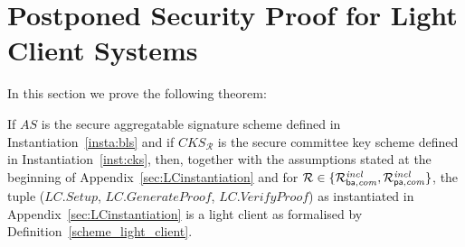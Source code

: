 \section{Postponed Security Proof for Light Client Systems}
\label{supplementary_proof_sec_soundness}

\noindent In this section we prove the following theorem:

\begingroup
\renewcommand{\thetheorem}{\ref{th:soundness}}
\begin{theorem} 
If $\mathit{AS}$ is the secure aggregatable signature scheme defined in Instantiation~\ref{insta:bls} and if 
$\mathit{CKS_{\mathcal{R}}}$ is the secure committee key scheme defined in Instantiation~\ref{inst:cks}, 
then, together with the assumptions stated at the beginning of Appendix~\ref{sec:LCinstantiation} and for 
$\mathcal{R} \in \{ \mathcal{R}^{\mathit{incl}}_{\mathsf{ba},\mathit{com}}, \mathcal{R}^{\mathit{incl}}_{\mathsf{pa},\mathit{com}} \}$, the tuple ($\mathit{LC.Setup}$, $\mathit{LC.GenerateProof}$, $\mathit{LC.VerifyProof}$) 
as instantiated in Appendix~\ref{sec:LCinstantiation} is a light client  as formalised by Definition~\ref{scheme_light_client}.
\end{theorem}
\addtocounter{theorem}{-1}
\endgroup

